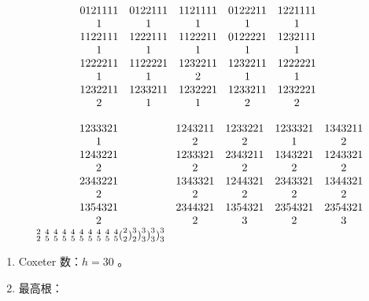 \[
\begin{array}{c c c c c} 0   1   2   1   1   1   1 & 0   1   2   2   1   1   1 & 1   1   2   1   1   1   1 & 0   1   2   2   2   1   1 & 1   2   2   1   1   1   1 \\ 1 & 1 & 1 & 1 & 1 \\ 1   1   2   2   1   1   1 & 1   2   2   2   1   1   1 & 1   1   2   2   2   1   1 & 0   1   2   2   2   2   1 & 1   2   3   2   1   1   1 \\ 1 & 1 & 1 & 1 & 1 \\ 1   2   2   2   2   1   1 & 1   1   2   2   2   2   1 & 1   2   3   2   2   1   1 & 1   2   3   2   2   1   1 & 1   2   2   2   2   2   1 \\ 1 & 1 & 2 & 1 & 1 \\ 1   2   3   2   2   1   1 & 1   2   3   3   2   1   1 & 1   2   3   2   2   2   1 & 1   2   3   3   2   1   1 & 1   2   3   2   2   2   1 \\ 2 & 1 & 1 & 2 & 2 \end{array}
\]

\[
\begin{array}{c c c c c} 1   2   3   3   3   2   1 & 1   2   4   3   2   1   1 & 1   2   3   3   2   2   1 & 1   2   3   3   3   2   1 & 1   3   4   3   2   1   1 \\ 1 & 2 & 2 & 1 & 2 \\ 1   2   4   3   2   2   1 & 1   2   3   3   3   2   1 & 2   3   4   3   2   1   1 & 1   3   4   3   2   2   1 & 1   2   4   3   3   2   1 \\ 2 & 2 & 2 & 2 & 2 \\ 2   3   4   3   2   2   1 & 1   3   4   3   3   2   1 & 1   2   4   4   3   2   1 & 2   3   4   3   3   2   1 & 1   3   4   4   3   2   1 \\ 2 & 2 & 2 & 2 & 2 \\ 1   3   5   4   3   2   1 & 2   3   4   4   3   2   1 & 1   3   5   4   3   2   1 & 2   3   5   4   3   2   1 & 2   3   5   4   3   2   1 \\ 2 & 2 & 3 & 2 & 3 \\ \text { } _ {2} ^ {2} \text { } _ {5} ^ {4} \text { } _ {5} ^ {4} \text { } _ {5} ^ {4} \text { } _ {5} ^ {4} \text { } _ {5} ^ {4} \text { } _ {5} ^ {4} \text { } _ {5} ^ {4} \text { } _ {5} ^ {4} \text { } _ {5} ^ {4} \text {(} _ {2} ^ {2} \text {)} _ {2} ^ {3} \text {)} _ {3} ^ {3} \text {)} _ {3} ^ {3} \text {)} _ {3} ^ {3} \end{array}
\]

\begin{enumerate}
\def\labelenumi{(\Roman{enumi})}
\setcounter{enumi}{2}
\item
  Coxeter 数：\(h = 30\) 。
\item
  最高根：
\end{enumerate}


